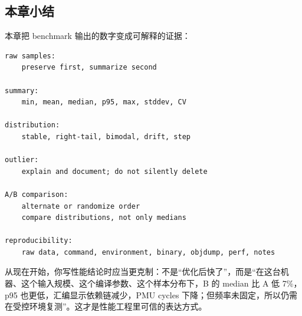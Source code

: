 \subsection{本章小结}

本章把 benchmark 输出的数字变成可解释的证据：

\begin{lstlisting}
raw samples:
    preserve first, summarize second

summary:
    min, mean, median, p95, max, stddev, CV

distribution:
    stable, right-tail, bimodal, drift, step

outlier:
    explain and document; do not silently delete

A/B comparison:
    alternate or randomize order
    compare distributions, not only medians

reproducibility:
    raw data, command, environment, binary, objdump, perf, notes
\end{lstlisting}

从现在开始，你写性能结论时应当更克制：不是“优化后快了”，而是“在这台机器、这个输入规模、这个编译参数、这个样本分布下，B 的 median 比 A 低 7\%，p95 也更低，汇编显示依赖链减少，PMU cycles 下降；但频率未固定，所以仍需在受控环境复测”。这才是性能工程里可信的表达方式。
